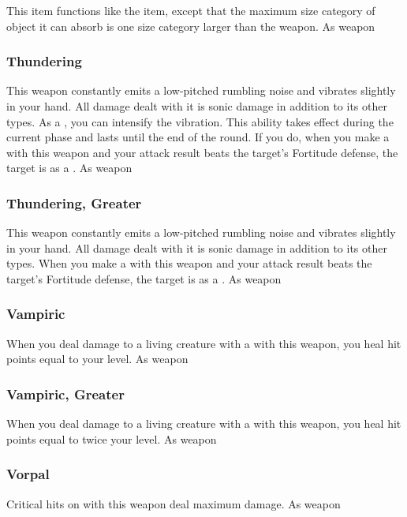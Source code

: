 This item functions like the  item, except that the maximum size category of object it can absorb is one size category larger than the weapon.
 
 As weapon
\lowercase{\hypertarget{item:Thundering}{}}\label{item:Thundering}
\hypertarget{item:Thundering}{\subsubsection{Thundering\hfill{}}}
This weapon constantly emits a low-pitched rumbling noise and vibrates slightly in your hand.
All damage dealt with it is sonic damage in addition to its other types.
As a , you can intensify the vibration.
This ability takes effect during the current phase and lasts until the end of the round.
If you do, when you make a  with this weapon and your attack result beats the target's Fortitude defense, the target is \deafened as a .
 
 As weapon
\lowercase{\hypertarget{item:Thundering, Greater}{}}\label{item:Thundering, Greater}
\hypertarget{item:Thundering, Greater}{\subsubsection{Thundering, Greater\hfill{}}}
This weapon constantly emits a low-pitched rumbling noise and vibrates slightly in your hand.
All damage dealt with it is sonic damage in addition to its other types.
When you make a  with this weapon and your attack result beats the target's Fortitude defense, the target is \deafened as a .
 
 As weapon
\lowercase{\hypertarget{item:Vampiric}{}}\label{item:Vampiric}
\hypertarget{item:Vampiric}{\subsubsection{Vampiric\hfill{}}}
When you deal damage to a living creature with a  with this weapon, you heal hit points equal to your level.
 
 As weapon
\lowercase{\hypertarget{item:Vampiric, Greater}{}}\label{item:Vampiric, Greater}
\hypertarget{item:Vampiric, Greater}{\subsubsection{Vampiric, Greater\hfill{}}}
When you deal damage to a living creature with a  with this weapon, you heal hit points equal to twice your level.
 
 As weapon
\lowercase{\hypertarget{item:Vorpal}{}}\label{item:Vorpal}
\hypertarget{item:Vorpal}{\subsubsection{Vorpal\hfill{}}}
Critical hits on  with this weapon deal maximum damage.
 
 As weapon